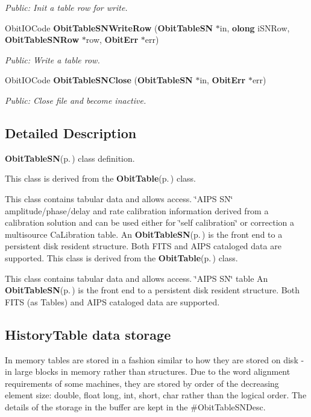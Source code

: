 \begin{CompactItemize}
\begin{CompactList}\small\item\em Public: Init a table row for write. \item\end{CompactList}\item 
Obit\-IOCode {\bf Obit\-Table\-SNWrite\-Row} ({\bf Obit\-Table\-SN} $\ast$in, {\bf olong} i\-SNRow, {\bf Obit\-Table\-SNRow} $\ast$row, {\bf Obit\-Err} $\ast$err)
\begin{CompactList}\small\item\em Public: Write a table row. \item\end{CompactList}\item 
Obit\-IOCode {\bf Obit\-Table\-SNClose} ({\bf Obit\-Table\-SN} $\ast$in, {\bf Obit\-Err} $\ast$err)
\begin{CompactList}\small\item\em Public: Close file and become inactive. \item\end{CompactList}\end{CompactItemize}


\subsection{Detailed Description}
{\bf Obit\-Table\-SN}{\rm (p.\,\pageref{structObitTableSN})} class definition. 

This class is derived from the {\bf Obit\-Table}{\rm (p.\,\pageref{structObitTable})} class.

This class contains tabular data and allows access. \char`\"{}AIPS SN\char`\"{} amplitude/phase/delay and rate calibration information derived from a calibration solution and can be used either for \char`\"{}self calibration\char`\"{} or correction a multisource Ca\-Libration table. An {\bf Obit\-Table\-SN}{\rm (p.\,\pageref{structObitTableSN})} is the front end to a persistent disk resident structure. Both FITS and AIPS cataloged data are supported. This class is derived from the {\bf Obit\-Table}{\rm (p.\,\pageref{structObitTable})} class.

This class contains tabular data and allows access. \char`\"{}AIPS SN\char`\"{} table An {\bf Obit\-Table\-SN}{\rm (p.\,\pageref{structObitTableSN})} is the front end to a persistent disk resident structure. Both FITS (as Tables) and AIPS cataloged data are supported.\subsection{History\-Table data storage}\label{ObitTableWX_8h_TableDataStorage}
In memory tables are stored in a fashion similar to how they are stored on disk - in large blocks in memory rather than structures. Due to the word alignment requirements of some machines, they are stored by order of the decreasing element size: double, float long, int, short, char rather than the logical order. The details of the storage in the buffer are kept in the \#Obit\-Table\-SNDesc.

